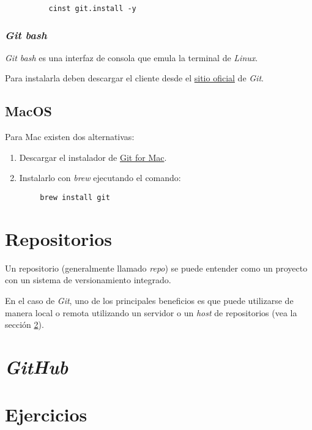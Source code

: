         \begin{verbatim}
          cinst git.install -y
        \end{verbatim}

      \subsubsection{\textit{Git bash}}
        \textit{Git bash} es una interfaz de consola que emula la terminal de 
        \textit{Linux}.
        
        Para instalarla deben descargar el cliente desde el 
        \href{https://git-scm.com/download/win}{sitio oficial} de \textit{Git}.

    \subsection{MacOS}
      Para Mac existen dos alternativas:
      \begin{enumerate}
        \item Descargar el instalador de 
          \href{https://sourceforge.net/projects/git-osx-installer/files/}{Git for Mac}.
        \item Instalarlo con \textit{brew} ejecutando el comando:
      \end{enumerate}

      \begin{verbatim}
        brew install git
      \end{verbatim}

  \section{Repositorios}
    Un repositorio (generalmente llamado \textit{repo}) se puede entender como un proyecto
    con un sistema de versionamiento integrado.

    En el caso de \textit{Git}, uno de los principales beneficios es que puede utilizarse
    de manera local o remota utilizando un servidor o un \textit{host} de repositorios 
    (vea la sección \ref{sec:github}).

  \section{\textit{GitHub}}
    \label{sec:github}

  \section{Ejercicios}
